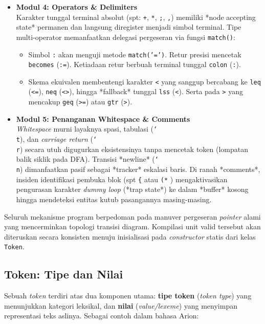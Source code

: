 \documentclass[12pt,a4paper]{article}
\begin{document}
\begin{itemize}
    \item \textbf{Modul 4: Operators \& Delimiters}\\
    Karakter tunggal terminal absolut (spt: \texttt{+}, \texttt{*}, \texttt{;}, \texttt{,}) memiliki *node accepting state* permanen dan langsung diregister menjadi simbol terminal. Tipe multi-operator memanfaatkan delegasi pergeseran via fungsi \texttt{match()}:
    \begin{itemize}
        \item Simbol \texttt{:} akan menguji metode \texttt{match('=')}. Retur presisi mencetak \texttt{becomes} (\texttt{:=}). Ketiadaan retur berbuah terminal tunggal \texttt{colon} (\texttt{:}).
        \item Skema ekuivalen membentengi karakter \texttt{<} yang sanggup bercabang ke \texttt{leq} (\texttt{<=}), \texttt{neq} (\texttt{<>}), hingga *fallback* tunggal \texttt{lss} (\texttt{<}). Serta pada \texttt{>} yang mencakup \texttt{geq} (\texttt{>=}) atau \texttt{gtr} (\texttt{>}).
    \end{itemize}

    \item \textbf{Modul 5: Penanganan Whitespace \& Comments}\\
    \textit{Whitespace} murni layaknya spasi, tabulasi (\texttt{\char`\\t}), dan \textit{carriage return} (\texttt{\char`\\r}) secara utuh digugurkan eksistensinya tanpa mencetak token (lompatan balik siklik pada DFA). Transisi *newline* (\texttt{\char`\\n}) dimanfaatkan pasif sebagai *tracker* eskalasi baris.
    Di ranah *comments*, insiden identifikasi pembuka blok (spt \texttt{\{} atau \texttt{(*} ) mengaktivasikan pengurasan karakter \textit{dummy loop} (*trap state*) ke dalam *buffer* kosong hingga mendeteksi entitas kutub pasangannya masing-masing.
\end{itemize}

Seluruh mekanisme program berpedoman pada manuver pergeseran \textit{pointer} alami yang mencerminkan topologi transisi diagram. Kompilasi unit valid tersebut akan diteruskan secara konsisten menuju inisialisasi pada \textit{constructor} statis dari kelas \texttt{Token}.

\subsection{Token: Tipe dan Nilai}
Sebuah \textit{token} terdiri atas dua komponen utama: \textbf{tipe token} (\textit{token type}) yang menunjukkan kategori leksikal, dan \textbf{nilai} (\textit{value/lexeme}) yang menyimpan representasi teks aslinya. Sebagai contoh dalam bahasa Arion:
\end{document}
